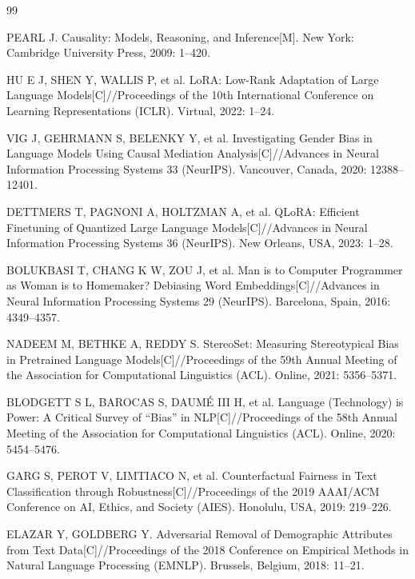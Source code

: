 \documentclass[12pt,a4paper,oneside]{ctexart}
\begin{document}
\begin{thebibliography}{99}

PEARL J. Causality: Models, Reasoning, and Inference[M]. New York: Cambridge University Press, 2009: 1--420.

HU E J, SHEN Y, WALLIS P, et al. LoRA: Low-Rank Adaptation of Large Language Models[C]//Proceedings of the 10th International Conference on Learning Representations (ICLR). Virtual, 2022: 1--24.

VIG J, GEHRMANN S, BELENKY Y, et al. Investigating Gender Bias in Language Models Using Causal Mediation Analysis[C]//Advances in Neural Information Processing Systems 33 (NeurIPS). Vancouver, Canada, 2020: 12388--12401.

DETTMERS T, PAGNONI A, HOLTZMAN A, et al. QLoRA: Efficient Finetuning of Quantized Large Language Models[C]//Advances in Neural Information Processing Systems 36 (NeurIPS). New Orleans, USA, 2023: 1--28.

BOLUKBASI T, CHANG K W, ZOU J, et al. Man is to Computer Programmer as Woman is to Homemaker? Debiasing Word Embeddings[C]//Advances in Neural Information Processing Systems 29 (NeurIPS). Barcelona, Spain, 2016: 4349--4357.

NADEEM M, BETHKE A, REDDY S. StereoSet: Measuring Stereotypical Bias in Pretrained Language Models[C]//Proceedings of the 59th Annual Meeting of the Association for Computational Linguistics (ACL). Online, 2021: 5356--5371.

BLODGETT S L, BAROCAS S, DAUM\'{E} III H, et al. Language (Technology) is Power: A Critical Survey of ``Bias'' in NLP[C]//Proceedings of the 58th Annual Meeting of the Association for Computational Linguistics (ACL). Online, 2020: 5454--5476.

GARG S, PEROT V, LIMTIACO N, et al. Counterfactual Fairness in Text Classification through Robustness[C]//Proceedings of the 2019 AAAI/ACM Conference on AI, Ethics, and Society (AIES). Honolulu, USA, 2019: 219--226.

ELAZAR Y, GOLDBERG Y. Adversarial Removal of Demographic Attributes from Text Data[C]//Proceedings of the 2018 Conference on Empirical Methods in Natural Language Processing (EMNLP). Brussels, Belgium, 2018: 11--21.


\end{thebibliography}
\end{document}
